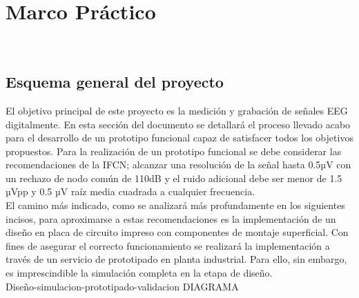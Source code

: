 \documentclass[11pt]{article}
\author{rodri}
\date{\today}
\title{}
\begin{document}
\tableofcontents

\chapter{Marco Práctico}\\

\section{Esquema general del proyecto}
\label{sec:orga31ba7f}

El objetivo principal de este proyecto es la medición y grabación de señales EEG digitalmente. En esta sección del documento se detallará el proceso llevado acabo para el desarrollo de un prototipo funcional capaz de satisfacer todos los objetivos propuestos. Para la realización de un prototipo funcional se debe considerar las recomendaciones de la IFCN; alcanzar una resolución de la señal hasta 0.5µV con un rechazo de nodo común de 110dB y el ruido adicional debe ser menor de 1.5 µVpp y 0.5 µV raíz media cuadrada a cualquier frecuencia.\\

El camino más indicado, como se analizará más profundamente en los siguientes incisos, para aproximarse a estas recomendaciones es la implementación de un diseño en placa de circuito impreso con componentes de montaje superficial. Con fines de asegurar el correcto funcionamiento se realizará la implementación a través de un servicio de prototipado en planta industrial. Para ello, sin embargo, es imprescindible la simulación completa en la etapa de diseño.\\

Diseño-simulacion-prototipado-validacion DIAGRAMA\\
\end{document}
